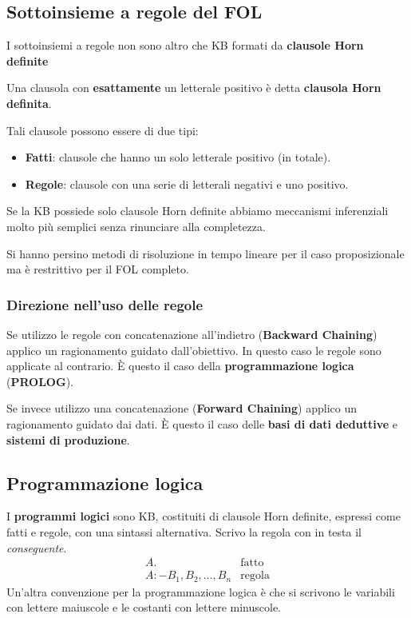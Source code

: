 \subsection{Sottoinsieme a regole del FOL}
I sottoinsiemi a regole non sono altro che KB formati da \textbf{clausole Horn definite}

\begin{definition}
	Una clausola con \textbf{esattamente} un letterale positivo \`e detta \textbf{clausola Horn definita}.
\end{definition}

Tali clausole possono essere di due tipi:
\begin{itemize}
	\item \textbf{Fatti}: clausole che hanno un solo letterale positivo (in totale).
	\item \textbf{Regole}: clausole con una serie di letterali negativi e uno positivo.
\end{itemize}
Se la KB possiede solo clausole Horn definite abbiamo meccanismi inferenziali molto pi\`u semplici senza rinunciare
alla completezza.

Si hanno persino metodi di risoluzione in tempo lineare per il caso proposizionale ma \`e restrittivo per il FOL completo.

\subsubsection{Direzione nell'uso delle regole}
Se utilizzo le regole con concatenazione all'indietro (\textbf{Backward Chaining}) applico un ragionamento guidato
dall'obiettivo. In questo caso le regole sono applicate al contrario. \`E questo il caso della
\textbf{programmazione logica} (\textbf{PROLOG}).

Se invece utilizzo una concatenazione (\textbf{Forward Chaining}) applico un ragionamento guidato dai dati. \`E questo il
caso delle \textbf{basi di dati deduttive} e \textbf{sistemi di produzione}.

\subsection{Programmazione logica}
I \textbf{programmi logici} sono KB, costituiti di clausole Horn definite, espressi come fatti e regole, con una sintassi
alternativa. Scrivo la regola con in testa il \emph{conseguente}.
\[
	\begin{array}{ll}
		A.                        & \text{fatto}  \\
		A :- B_1, B_2, \dots, B_n & \text{regola}
	\end{array}
\]
Un'altra convenzione per la programmazione logica \`e che si scrivono le variabili con lettere maiuscole e le costanti
con lettere minuscole.

